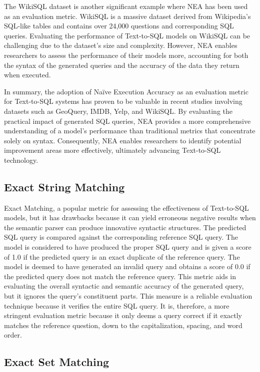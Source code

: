 The WikiSQL dataset is another significant example where NEA has been used as an evaluation metric. WikiSQL is a massive dataset derived from Wikipedia's SQL-like tables and contains over 24,000 questions and corresponding SQL queries. Evaluating the performance of Text-to-SQL models on WikiSQL can be challenging due to the dataset's size and complexity. However, NEA enables researchers to assess the performance of their models more, accounting for both the syntax of the generated queries and the accuracy of the data they return when executed.

In summary, the adoption of Naïve Execution Accuracy as an evaluation metric for Text-to-SQL systems has proven to be valuable in recent studies involving datasets such as GeoQuery, IMDB, Yelp, and WikiSQL. By evaluating the practical impact of generated SQL queries, NEA provides a more comprehensive understanding of a model's performance than traditional metrics that concentrate solely on syntax. Consequently, NEA enables researchers to identify potential improvement areas more effectively, ultimately advancing Text-to-SQL technology.

\subsection{Exact String Matching}

Exact Matching\cite{xu_sqlnet_2017}, a popular metric for assessing the effectiveness of Text-to-SQL models, but it has drawbacks because it can yield erroneous negative results when the semantic parser can produce innovative syntactic structures. The predicted SQL query is compared against the corresponding reference SQL query. The model is considered to have produced the proper SQL query and is given a score of 1.0 if the predicted query is an exact duplicate of the reference query. The model is deemed to have generated an invalid query and obtains a score of 0.0 if the predicted query does not match the reference query. This metric aids in evaluating the overall syntactic and semantic accuracy of the generated query, but it ignores the query's constituent parts. This measure is a reliable evaluation technique because it verifies the entire SQL query. It is, therefore, a more stringent evaluation metric because it only deems a query correct if it exactly matches the reference question, down to the capitalization, spacing, and word order.


\subsection{Exact Set Matching}

